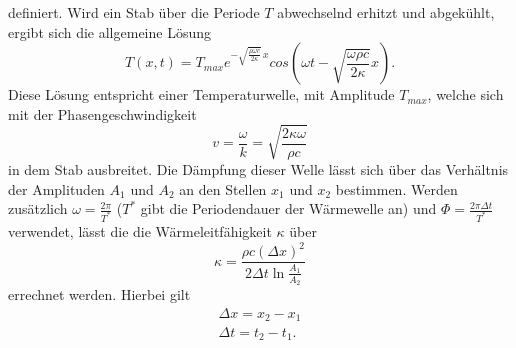 \noindent definiert. Wird ein Stab über die Periode $T$ abwechselnd erhitzt und abgekühlt, 
ergibt sich die allgemeine Lösung
\begin{equation}
    T(x,t) = T_{max} e^{-\sqrt{\frac{\rho \omega c}{2\kappa}}\,x} cos \left( \omega t - \sqrt{\frac{\omega \rho c}{2 \kappa}}x \right).
\end{equation}
\noindent Diese Lösung entspricht einer Temperaturwelle, mit Amplitude $T_{max}$, welche sich mit der Phasengeschwindigkeit
\begin{equation}
    v = \frac{\omega}{k} = \sqrt{ \frac{2 \kappa \omega}{\rho c} }
\end{equation}
\noindent in dem Stab ausbreitet. Die Dämpfung dieser Welle lässt sich über das Verhältnis der
Amplituden $A_1$ und $A_2$ an den Stellen $x_1$ und $x_2$ bestimmen. Werden zusätzlich
$\omega = \frac{2 \pi}{T^*}$ ($T^*$ gibt die Periodendauer der Wärmewelle an) und 
$\Phi = \frac{2 \pi \Delta t}{T^*}$ verwendet, lässt die die Wärmeleitfähigkeit $\kappa$ 
über
\begin{equation}
    \kappa = \frac{\rho c (\Delta x)^2}{2 \Delta t \ln{\frac{A_1}{A_2}}}
\end{equation}
\noindent errechnet werden. Hierbei gilt 
\begin{align}
    \Delta x = x_2 - x_1 \nonumber \\
    \Delta t = t_2 - t_1 \nonumber.
\end{align}